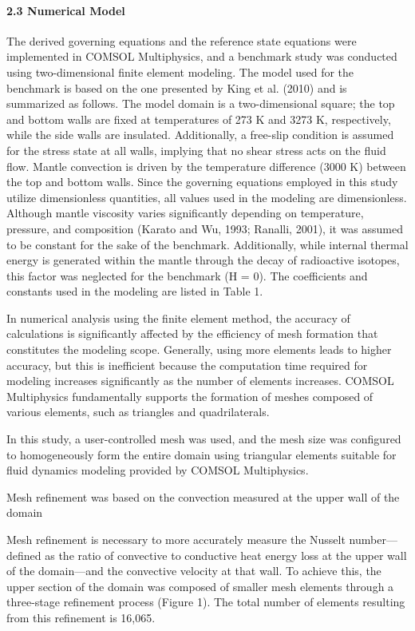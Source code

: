 \paragraph{2.3 Numerical Model}


The derived governing equations and the reference state equations were implemented in COMSOL Multiphysics, and a benchmark study was conducted using two-dimensional finite element modeling. The model used for the benchmark is based on the one presented by King et al. (2010) and is summarized as follows. The model domain is a two-dimensional square; the top and bottom walls are fixed at temperatures of 273 K and 3273 K, respectively, while the side walls are insulated. Additionally, a free-slip condition is assumed for the stress state at all walls, implying that no shear stress acts on the fluid flow. Mantle convection is driven by the temperature difference (3000 K) between the top and bottom walls.
Since the governing equations employed in this study utilize dimensionless quantities, all values used in the modeling are dimensionless. Although mantle viscosity varies significantly depending on temperature, pressure, and composition (Karato and Wu, 1993; Ranalli, 2001), it was assumed to be constant for the sake of the benchmark. Additionally, while internal thermal energy is generated within the mantle through the decay of radioactive isotopes, this factor was neglected for the benchmark (H = 0). The coefficients and constants used in the modeling are listed in Table 1.


In numerical analysis using the finite element method, the accuracy of calculations is significantly affected by the efficiency of mesh formation that constitutes the modeling scope. Generally, using more elements leads to higher accuracy, but this is inefficient because the computation time required for modeling increases significantly as the number of elements increases. COMSOL Multiphysics fundamentally supports the formation of meshes composed of various elements, such as triangles and quadrilaterals.

In this study, a user-controlled mesh was used, and the mesh size was configured to homogeneously form the entire domain using triangular elements suitable for fluid dynamics modeling provided by COMSOL Multiphysics.

Mesh refinement was based on the convection measured at the upper wall of the domain

Mesh refinement is necessary to more accurately measure the Nusselt number—defined as the ratio of convective to conductive heat energy loss at the upper wall of the domain—and the convective velocity at that wall. To achieve this, the upper section of the domain was composed of smaller mesh elements through a three-stage refinement process (Figure 1). The total number of elements resulting from this refinement is 16,065.

